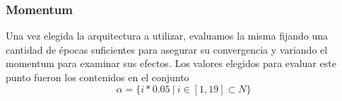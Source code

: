 \documentclass[informe.tex]{subfiles}
\begin{document}
    \subsubsection{Momentum}
      Una vez elegida la arquitectura a utilizar, evaluamos la misma fijando una cantidad de \'epocas suficientes para asegurar su convergencia y variando el momentum para examinar sus efectos. Los valores elegidos para evaluar este punto fueron los contenidos en el conjunto 
      $$\alpha = \{ i*0.05\ |\ i \in [1, 19] \subset N \}$$
      
      
  
\end{document}
